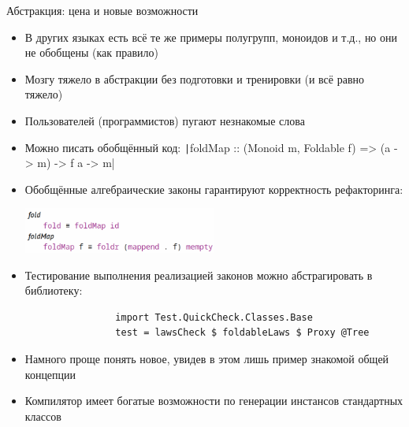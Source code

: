
    \appendix

    \begin{frame}[fragile]{Абстракция: цена и новые возможности}
        \vspace{-0.5em}
        \begin{itemize}
            \item В других языках есть всё те же примеры полугрупп, моноидов и т.д., но они не обобщены (как правило)
            \item[\negative] Мозгу тяжело в абстракции без подготовки и тренировки (и всё равно тяжело)
            \item[\negative] Пользователей (программистов) пугают незнакомые слова
            \item[\positive] Можно писать обобщённый код: \texttt|foldMap :: (Monoid m, Foldable f) => (a -> m) -> f a -> m|
            \item[\positive] Обобщённые алгебраические законы гарантируют корректность рефакторинга:
            \begin{center}
                \includegraphics[width=0.5\textwidth]{figs/foldLaws}
            \end{center}
            \item[\positive] Тестирование выполнения реализацией законов можно абстрагировать в библиотеку:
            \begin{verbatim}
                import Test.QuickCheck.Classes.Base
                test = lawsCheck $ foldableLaws $ Proxy @Tree
            \end{verbatim}
            \item[\positive] Намного проще понять новое, увидев в этом лишь пример знакомой общей концепции
            \item[\positive] Компилятор имеет богатые возможности по генерации инстансов стандартных классов
        \end{itemize}
    \end{frame}

